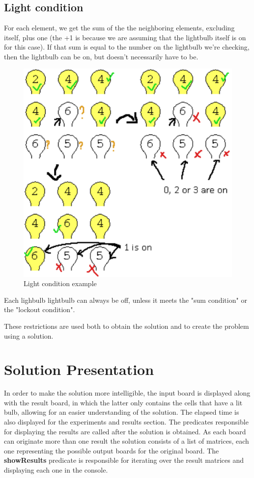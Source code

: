 \documentclass[runningheads]{llncs}
\begin{document}
\subsection*{Light condition}
For each element, we get the sum of the the neighboring elements, excluding itself, plus one (the +1 is because we are assuming that the lightbulb itself is on for this case).\hfill \break
If that sum is equal to the number on the lightbulb we're checking, then the lightbulb can be on, but doesn't necessarily have to be.

\begin{figure}
	\includegraphics[scale=0.5]{lightbulb_light_condition_example}
	\centering
	\caption{Light condition example}
	\centering
	\end{figure}

Each lighbulb lightbulb can always be off, unless it meets the "sum condition" or the "lockout condition".\hfill \break

These restrictions are used both to obtain the solution and to create the problem using a solution.\hfill \break

\clearpage
\section{Solution Presentation}
In order to make the solution more intelligible, the input board is displayed along with the result board, in which the latter
only contains the cells that have a lit bulb, allowing for an easier understanding of the solution. The elapsed time is also displayed for the experiments and results section.\hfill \break
The predicates responsible for displaying the results are called after the solution is obtained. As each board can originate more than one result the solution consists of a list of matrices, each one representing the possible output boards for the original board. The \textbf{showResults} predicate is responsible for iterating over the result matrices and displaying each one in the console.
\end{document}

